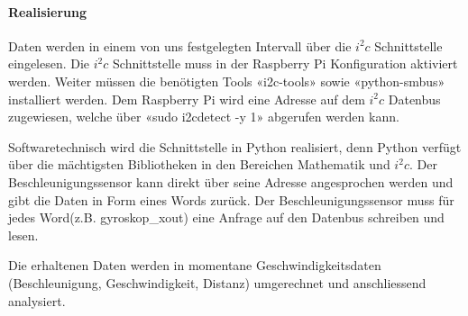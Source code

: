 \documentclass[../../main.tex]{subfiles}
\begin{document}
\paragraph{Realisierung}
Daten werden in einem von uns festgelegten Intervall über die $i^2c$ Schnittstelle eingelesen. Die $i^2c$ Schnittstelle muss in der Raspberry Pi Konfiguration aktiviert werden. Weiter müssen die benötigten Tools «i2c-tools» sowie «python-smbus» installiert werden. Dem Raspberry Pi wird eine Adresse auf dem $i^2c$ Datenbus zugewiesen, welche über «sudo i2cdetect -y 1» abgerufen werden kann.

Softwaretechnisch wird die Schnittstelle in Python realisiert, denn Python verfügt über die mächtigsten Bibliotheken in den Bereichen Mathematik und $i^2c$. Der Beschleunigungssensor kann direkt über seine Adresse angesprochen werden und gibt die Daten in Form eines Words zurück. Der Beschleunigungssensor muss für jedes Word(z.B. gyroskop\_xout) eine Anfrage auf den Datenbus schreiben und lesen.

Die erhaltenen Daten werden in momentane Geschwindigkeitsdaten (Beschleunigung, Geschwindigkeit, Distanz) umgerechnet und anschliessend analysiert.
\end{document}
